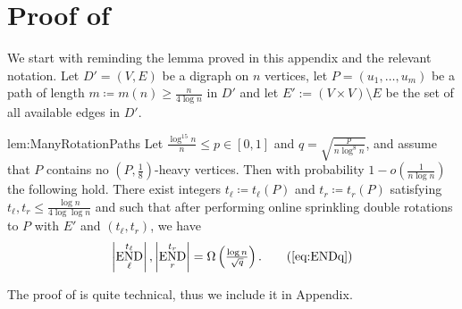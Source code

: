 \documentclass{article}
\DeclareMathOperator{\END}{END}
\begin{document}
\appendix

\section{\texorpdfstring{Proof of }{Proof of Lemma 4.2}}
\label{appendix:rotations}
We start with reminding the lemma proved in this appendix and the relevant notation.
Let $D'=(V,E)$ be a digraph on $n$ vertices, let $P = (u_1, \ldots, u_m)$ be a path of length $m \coloneqq m(n) \ge \frac{n}{4\log n}$ in $D'$ and let $E':=(V\times V)\setminus E$ be the set of all available edges in $D'$.

\begin{replemma}{lem:ManyRotationPaths}
	Let $\frac{\log^{15}n}{n} \le p \in [0,1]$ and $q = \sqrt{\frac{p}{n \log^8 n}}$, and assume that $P$ contains no $\left(P, \frac{1}{8} \right)$-heavy vertices.
	Then with probability $1-o\left(\frac{1}{n \log n} \right)$ the following hold.
	There exist integers $t_{\ell} \coloneqq t_{\ell}(P)$ and $t_r \coloneqq t_r(P)$ satisfying $t_{\ell}, t_r \le \frac{\log n}{4\log\log n}$ and such that after performing online sprinkling double rotations to $P$ with $E'$ and $(t_{\ell},t_r)$, we have
	\begin{align}
	\left|\END_{\ell}^{t_{\ell}} \right|, \left|\END_r^{t_r} \right| = \Omega\left(\tfrac{\log n}{\sqrt{q}} \right). \tag{\ref{eq:ENDq}}
	\end{align}
\end{replemma}

The proof of  is quite technical, thus we include it in Appendix.
\end{document}
